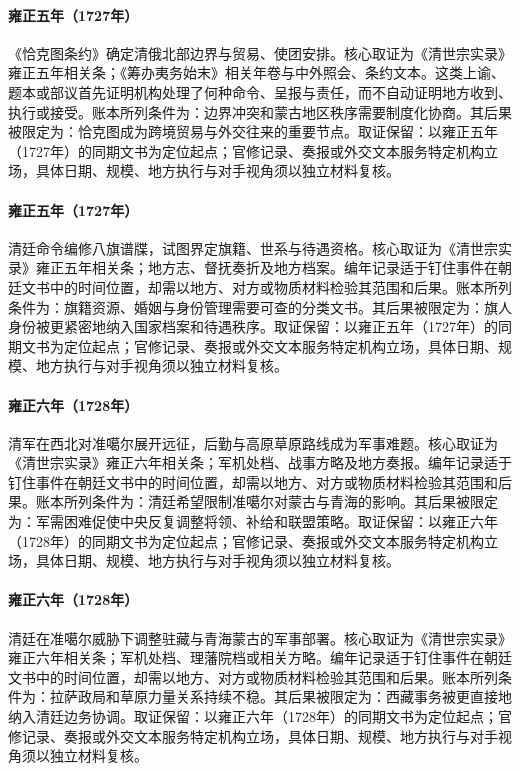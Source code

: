 \hypertarget{ledger:EQ-1727-KYAKHTA-TREATY}{}\paragraph{雍正五年（1727年）}《恰克图条约》确定清俄北部边界与贸易、使团安排。核心取证为《清世宗实录》雍正五年相关条；《筹办夷务始末》相关年卷与中外照会、条约文本。这类上谕、题本或部议首先证明机构处理了何种命令、呈报与责任，而不自动证明地方收到、执行或接受。账本所列条件为：边界冲突和蒙古地区秩序需要制度化协商。其后果被限定为：恰克图成为跨境贸易与外交往来的重要节点。取证保留：以雍正五年（1727年）的同期文书为定位起点；官修记录、奏报或外交文本服务特定机构立场，具体日期、规模、地方执行与对手视角须以独立材料复核。
\hypertarget{ledger:EQ-1727-BANNER-GENEALOGIES}{}\paragraph{雍正五年（1727年）}清廷命令编修八旗谱牒，试图界定旗籍、世系与待遇资格。核心取证为《清世宗实录》雍正五年相关条；地方志、督抚奏折及地方档案。编年记录适于钉住事件在朝廷文书中的时间位置，却需以地方、对方或物质材料检验其范围和后果。账本所列条件为：旗籍资源、婚姻与身份管理需要可查的分类文书。其后果被限定为：旗人身份被更紧密地纳入国家档案和待遇秩序。取证保留：以雍正五年（1727年）的同期文书为定位起点；官修记录、奏报或外交文本服务特定机构立场，具体日期、规模、地方执行与对手视角须以独立材料复核。
\hypertarget{ledger:EQ-1728-Dzungar-EXPEDITION}{}\paragraph{雍正六年（1728年）}清军在西北对准噶尔展开远征，后勤与高原草原路线成为军事难题。核心取证为《清世宗实录》雍正六年相关条；军机处档、战事方略及地方奏报。编年记录适于钉住事件在朝廷文书中的时间位置，却需以地方、对方或物质材料检验其范围和后果。账本所列条件为：清廷希望限制准噶尔对蒙古与青海的影响。其后果被限定为：军需困难促使中央反复调整将领、补给和联盟策略。取证保留：以雍正六年（1728年）的同期文书为定位起点；官修记录、奏报或外交文本服务特定机构立场，具体日期、规模、地方执行与对手视角须以独立材料复核。
\hypertarget{ledger:EQ-1728-ZHUNGHAR-TIBET-SETTLEMENT}{}\paragraph{雍正六年（1728年）}清廷在准噶尔威胁下调整驻藏与青海蒙古的军事部署。核心取证为《清世宗实录》雍正六年相关条；军机处档、理藩院档或相关方略。编年记录适于钉住事件在朝廷文书中的时间位置，却需以地方、对方或物质材料检验其范围和后果。账本所列条件为：拉萨政局和草原力量关系持续不稳。其后果被限定为：西藏事务被更直接地纳入清廷边务协调。取证保留：以雍正六年（1728年）的同期文书为定位起点；官修记录、奏报或外交文本服务特定机构立场，具体日期、规模、地方执行与对手视角须以独立材料复核。
